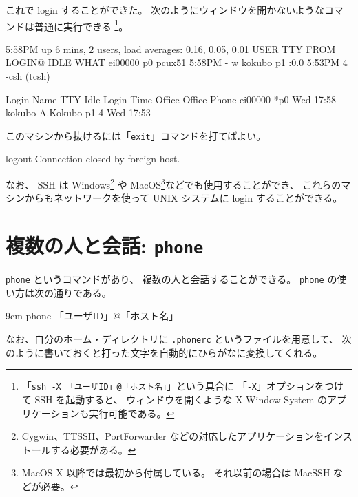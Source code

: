 \newpage

これで login することができた。
次のようにウィンドウを開かないようなコマンドは普通に実行できる
\footnote{「\texttt{ssh -X 「ユーザID」@「ホスト名」}」という具合に
「\texttt{-X}」オプションをつけて SSH を起動すると、
ウィンドウを開くような X Window System のアプリケーションも実行可能である。}。

\begin{progls}

 5:58PM  up 6 mins, 2 users, load averages: 0.16, 0.05, 0.01
USER     TTY FROM              LOGIN@  IDLE WHAT
ei00000  p0  pcux51            5:58PM     - w
kokubo   p1  :0.0              5:53PM     4 -csh (tcsh)
%
\end{progls}
\begin{progls}
Login    Name                 TTY  Idle  Login Time   Office     Office Phone
ei00000                      *p0         Wed    17:58
kokubo   A.Kokubo             p1      4  Wed    17:53
%
\end{progls}

このマシンから抜けるには「\texttt{exit}」コマンドを打てばよい。

\begin{progls}
logout
Connection closed by foreign host.
%
\end{progls}

なお、 SSH は Windows\footnote{Cygwin、TTSSH、PortForwarder
などの対応したアプリケーションをインストールする必要がある。}
や MacOS\footnote{MacOS X 以降では最初から付属している。
それ以前の場合は MacSSH などが必要。}などでも使用することができ、
これらのマシンからもネットワークを使って UNIX システムに
 login することができる。

\newpage

\section{複数の人と会話: \texttt{phone}}

\texttt{phone} というコマンドがあり、
複数の人と会話することができる。
\texttt{phone} の使い方は次の通りである。

\begin{coml}{9cm}
phone 「ユーザID」@「ホスト名」
\end{coml}

なお、自分のホーム・ディレクトリに \texttt{.phonerc} というファイルを用意して、
次のように書いておくと打った文字を自動的にひらがなに変換してくれる。

